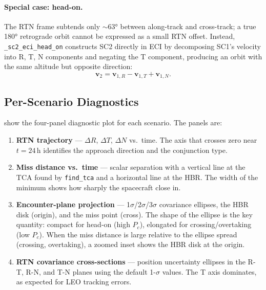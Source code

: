 \documentclass[11pt]{article}
\begin{document}
\paragraph{Special case: head-on.}  The RTN frame subtends only $\sim$63° between
along-track and cross-track; a true 180° retrograde orbit cannot be expressed
as a small RTN offset.  Instead, \texttt{\_sc2\_eci\_head\_on} constructs SC2
directly in ECI by decomposing SC1's velocity into R, T, N components and
negating the T component, producing an orbit with the same altitude but opposite
direction:
\begin{equation}
  \mathbf{v}_2 = \mathbf{v}_{1,R} - \mathbf{v}_{1,T} + \mathbf{v}_{1,N}.
\end{equation}

\subsection{Per-Scenario Diagnostics}
\label{sec:vis_4panel}

show the four-panel diagnostic plot for each scenario.  The panels are:
\begin{enumerate}
  \item \textbf{RTN trajectory} — $\Delta R$, $\Delta T$, $\Delta N$ vs.\ time.
        The axis that crosses zero near $t=24$\,h identifies the approach
        direction and the conjunction type.
  \item \textbf{Miss distance vs.\ time} — scalar separation with a vertical
        line at the TCA found by \texttt{find\_tca} and a horizontal line at
        the HBR.  The width of the minimum shows how sharply the spacecraft
        close in.
  \item \textbf{Encounter-plane projection} — 1$\sigma$/2$\sigma$/3$\sigma$
        covariance ellipses, the HBR disk (origin), and the miss point (cross).
        The shape of the ellipse is the key quantity: compact for head-on
        (high $P_c$), elongated for crossing/overtaking (low $P_c$).
        When the miss distance is large relative to the ellipse spread (crossing,
        overtaking), a zoomed inset shows the HBR disk at the origin.
  \item \textbf{RTN covariance cross-sections} — position uncertainty
        ellipses in the R-T, R-N, and T-N planes using the default 1-$\sigma$
        values.  The T axis dominates, as expected for LEO tracking errors.
\end{enumerate}
\end{document}
